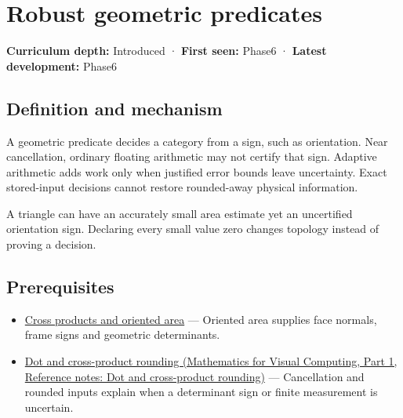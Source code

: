 \hypertarget{appendix-341296fb3f64}{}\label{referencestart:appendix-341296fb3f64}
\section{Robust geometric predicates}\label{appendix-341296fb3f64-robust-geometric-predicates}

\hypertarget{appendix-341296fb3f64-robust-geometric-predicates}{}

\textbf{Curriculum depth:} Introduced · \textbf{First seen:} Phase6 · \textbf{Latest development:} Phase6

\begin{allmightroledefinition}

\subsection{Definition and mechanism}\label{appendix-341296fb3f64-definition-and-mechanism}

\hypertarget{appendix-341296fb3f64-definition-and-mechanism}{}

A geometric predicate decides a category from a sign, such as orientation. Near cancellation, ordinary floating arithmetic may not certify that sign. Adaptive arithmetic adds work only when justified error bounds leave uncertainty. Exact stored-input decisions cannot restore rounded-away physical information.

\end{allmightroledefinition}

A triangle can have an accurately small area estimate yet an uncertified orientation sign. Declaring every small value zero changes topology instead of proving a decision.

\subsection{Prerequisites}\label{appendix-341296fb3f64-prerequisites}

\hypertarget{appendix-341296fb3f64-prerequisites}{}

\begin{itemize}
\tightlist
\item
  \hyperref[appendix-2391db8052b1]{Cross products and oriented area} --- Oriented area supplies face normals, frame signs and geometric determinants.
\item
  \href{../02-Mathematics-for-Visual-Computing-P01/main.pdf\#nameddest=appendix-5aef4f13483a}{Dot and cross-product rounding (Mathematics for Visual Computing, Part 1, Reference notes: Dot and cross-product rounding)} --- Cancellation and rounded inputs explain when a determinant sign or finite measurement is uncertain.
\end{itemize}

